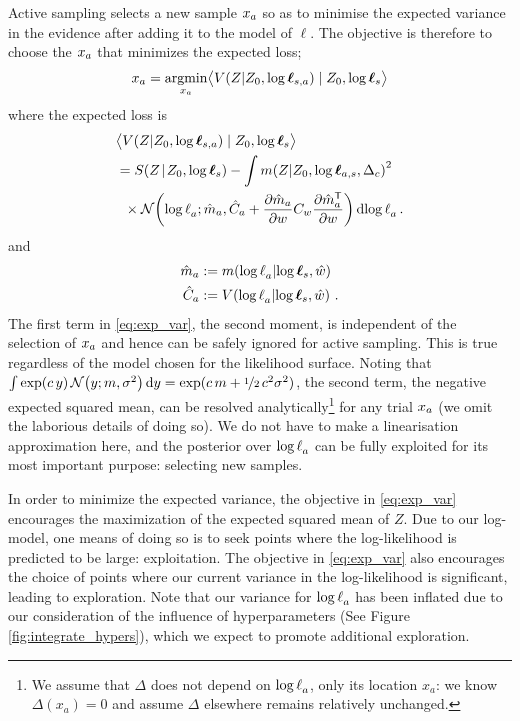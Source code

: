 \documentclass{article}
\begin{document}
Active sampling selects a new sample $\lfv_a$ so as to minimise the expected variance in the evidence after adding it to the model of $\ell$.  The objective is therefore to choose the $\lfv_a$ that minimizes the expected loss;
%
\begin{align}
\lfv_a = \argmin_{\lfv_a} \bigl\langle \cov{\If}{Z_0,\tvr_{s,a}}\mid Z_0,\tvr_{s}\bigr\rangle 
\end{align}
where the expected loss is
\begin{align}
&\bigl\langle \cov{\If}{Z_0,\tvr_{s,a}}\mid Z_0,\tvr_{s}\bigr\rangle 
\nonumber\\
 & = \secm{\If}{Z_0,\tvr_s} 
 - \int\mean{\If}{Z_0,\tvr_{a,s},\Delta_c}^2\nonumber\\
& \hspace{0.2cm}
\times\N{\tr_a}
{\hat{m}_a }
{\hat{C}_a +\pderiv{\hat{m}_a}{w}C_w\pderiv{\hat{m}\tra_a}{w}}
\ud\tr_a\,.\label{eq:exp_var}
\end{align}
and
\begin{align}
\hat{m}_a & \deq \mean{\tr_a}{\tvr_s,\hat{w}}\\ 
\hat{C}_a & \deq \cov{\tr_a}{\tvr_s,\hat{w}}\,.
\end{align}
The first term in \eqref{eq:exp_var}, the second moment, is independent of the selection of $\lfv_a$ and hence can be safely ignored for active sampling. This is true regardless of the model chosen for the likelihood surface. 
Noting that $\int \exp(c\, y)\, \N{y}{m}{\sigma^2} \ud y = \exp(c\, m + \nicefrac{1}{2}\, c^2 \sigma^2)$, 
the second term, the negative expected squared mean, can be resolved analytically\footnote{We assume that $\Delta$ does not depend on $\tr_a$, only its location $x_a$: we know $\Delta(x_a) = 0$ and assume $\Delta$ elsewhere remains relatively unchanged.}
 for any trial $\lfv_a$ (we omit the laborious details of doing so). We do not have to make a linearisation approximation here, and the posterior over $\tr_a$ can be fully exploited for its most important purpose: selecting new samples. 

In order to minimize the expected variance, the objective in \eqref{eq:exp_var} encourages the maximization of the expected squared mean of $Z$. Due to our log-\gpb model, one means of doing so is to seek points where the log-likelihood is predicted to be large: exploitation.  The objective in \eqref{eq:exp_var} also encourages the choice of points where our current variance in the log-likelihood is significant, leading to exploration. Note that our variance for $\tr_a$ has been inflated due to our consideration of the influence of hyperparameters (See Figure \ref{fig:integrate_hypers}), which we expect to promote additional exploration.
\end{document}
